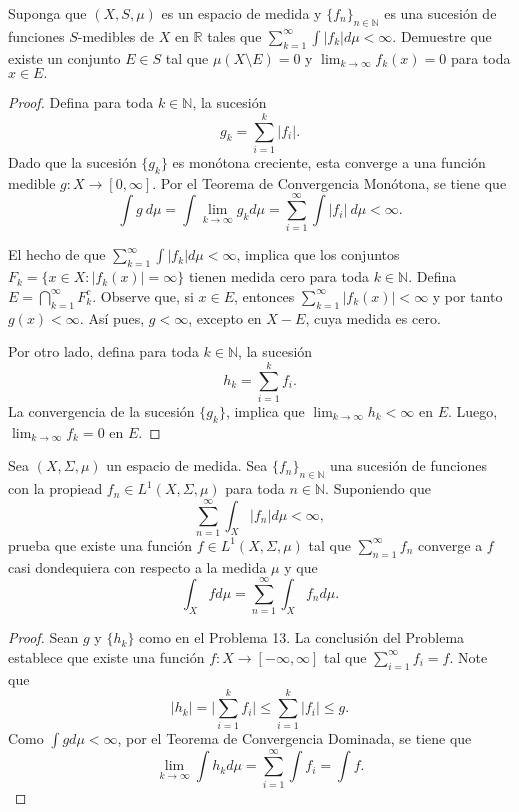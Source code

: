 \documentclass[12pt]{article}
\newcommand{\N}{\mathbb{N}}
\newcommand{\R}{\mathbb{R}}
\newenvironment{problem}[2][Problema]{\begin{trivlist}
\item[\hskip \labelsep {\bfseries #1}\hskip \labelsep {\bfseries #2.}]}{\end{trivlist}}
\begin{document}
\begin{problem}{13} Suponga que $(X, S, \mu)$ es un espacio de medida y $\{f_n\}_{n\in \N}$ es una sucesión de funciones $S$-medibles de $X$ en $\R$ tales que $\sum_{k=1}^\infty \int \lvert f_k \rvert d \mu < \infty$. Demuestre que existe un conjunto $E \in S$ tal que $\mu(X \setminus E) = 0$ y $\lim_{k \to \infty} f_k(x) = 0$ para toda $x \in E.$ 
\end{problem}
\begin{proof}
Defina para toda $k\in \N$, la sucesión
$$g_k = \sum_{i=1}^k \lvert f_i \rvert.$$
Dado que la sucesión $\{ g_k \}$ es monótona creciente, esta converge a una función medible $g: X \rightarrow [0, \infty].$ Por el Teorema de Convergencia Monótona, se tiene que
$$\int g \ d\mu = \int \lim_{k \to \infty} g_k d \mu = \sum_{i=1}^\infty \int \lvert f_i \rvert \ d \mu < \infty.$$

El hecho de que $\sum_{k=1}^\infty \int \lvert f_k \rvert d \mu < \infty$, implica que los conjuntos $F_k = \{x \in X: \lvert f_k(x) \rvert = \infty \}$ tienen medida cero para toda $k \in \N.$ 
Defina $E = \bigcap_{k=1}^\infty F_k^c$. Observe que, si $x\in E$, entonces $\sum_{k=1}^\infty \lvert f_k(x) \rvert < \infty $ y por tanto $g(x) < \infty$. Así pues, $g < \infty$, excepto en $X - E$, cuya medida es cero. 

Por otro lado, defina para toda $k \in \N$, la sucesión 
$$h_k = \sum_{i=1}^k  f_i.$$
La convergencia de la sucesión $\{g_k\}$, implica que $\lim_{k \to \infty} h_k < \infty$ en $E$. Luego, $\lim_{k \to \infty } f_k = 0$ en $E.$

\end{proof}
\begin{problem}{14} Sea $(X, \Sigma, \mu)$ un espacio de medida. Sea $\{f_n\}_{n \in \N}$ una sucesión de funciones con la propiead $f_n \in L^1(X, \Sigma, \mu)$ para toda $n \in \N$. Suponiendo que
$$\sum_{n=1}^\infty \int_{X} \lvert f_n \rvert d \mu < \infty,$$
prueba que existe una función $f \in L^1(X, \Sigma, \mu)$ tal que $\sum_{n=1}^\infty f_n$
converge a $f$ casi dondequiera con respecto a la medida $\mu$ y que 
$$\int_X f d \mu = \sum_{n=1}^\infty \int_X f_n d \mu.$$
\end{problem}
\begin{proof}
Sean $g$ y $\{h_k\}$ como en el Problema 13. La conclusión del Problema establece que existe una función $f: X \rightarrow [-\infty, \infty]$ tal que $\sum_{i=1}^\infty f_i = f$. Note que 
$$\lvert h_k \rvert = \lvert \sum_{i=1}^k f_i \rvert \leq \sum_{i=1}^k \lvert f_i \rvert \leq g. $$
Como $\int g d \mu < \infty$, por el Teorema de Convergencia Dominada, se tiene que 
$$\lim_{k \to \infty} \int h_k d \mu = \sum_{i=1}^\infty \int f_i = \int f.$$ 
\end{proof}
\end{document}
